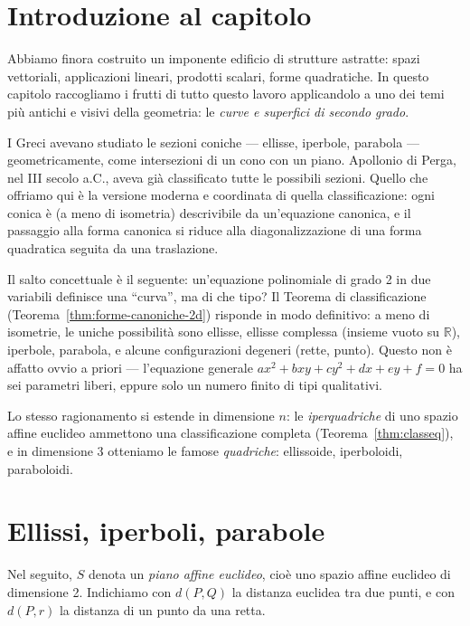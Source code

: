 \documentclass[11pt, a4paper]{book}
\theoremstyle{definition}
\theoremstyle{plain}
\theoremstyle{remark}
\newcommand{\R}{\mathbb{R}}
\begin{document}
\section*{Introduzione al capitolo}

Abbiamo finora costruito un imponente edificio di strutture astratte: spazi vettoriali, applicazioni lineari, prodotti scalari, forme quadratiche. In questo capitolo raccogliamo i frutti di tutto questo lavoro applicandolo a uno dei temi più antichi e visivi della geometria: le \emph{curve e superfici di secondo grado}.

I Greci avevano studiato le sezioni coniche — ellisse, iperbole, parabola — geometricamente, come intersezioni di un cono con un piano. Apollonio di Perga, nel III secolo a.C., aveva già classificato tutte le possibili sezioni. Quello che offriamo qui è la versione moderna e coordinata di quella classificazione: ogni conica è (a meno di isometria) descrivibile da un'equazione canonica, e il passaggio alla forma canonica si riduce alla diagonalizzazione di una forma quadratica seguita da una traslazione.

Il salto concettuale è il seguente: un'equazione polinomiale di grado 2 in due variabili definisce una ``curva'', ma di che tipo? Il Teorema di classificazione (Teorema~\ref{thm:forme-canoniche-2d}) risponde in modo definitivo: a meno di isometrie, le uniche possibilità sono ellisse, ellisse complessa (insieme vuoto su $\R$), iperbole, parabola, e alcune configurazioni degeneri (rette, punto). Questo non è affatto ovvio a priori — l'equazione generale $ax^2 + bxy + cy^2 + dx + ey + f = 0$ ha sei parametri liberi, eppure solo un numero finito di tipi qualitativi.

Lo stesso ragionamento si estende in dimensione $n$: le \emph{iperquadriche} di uno spazio affine euclideo ammettono una classificazione completa (Teorema~\ref{thm:classeq}), e in dimensione 3 otteniamo le famose \emph{quadriche}: ellissoide, iperboloidi, paraboloidi.

\section{Ellissi, iperboli, parabole}
\label{sec:coniche-def}

Nel seguito, $S$ denota un \emph{piano affine euclideo}, cioè uno spazio affine euclideo di dimensione 2. Indichiamo con $d(P,Q)$ la distanza euclidea tra due punti, e con $d(P, r)$ la distanza di un punto da una retta.
\end{document}
